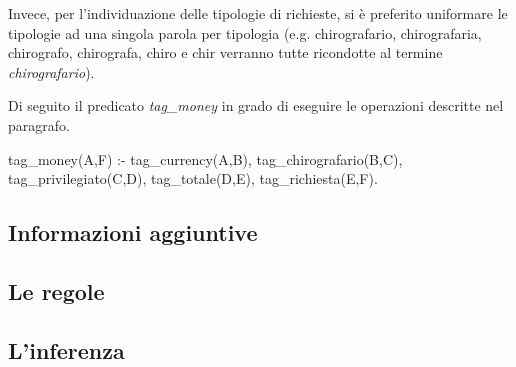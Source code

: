 Invece, per l'individuazione delle tipologie di richieste, si è preferito uniformare le tipologie ad una singola parola per tipologia (e.g. chirografario, chirografaria, chirografo, chirografa, chiro e chir verranno tutte ricondotte al termine \emph{chirografario}).

Di seguito il predicato \emph{tag\_money} in grado di eseguire le operazioni descritte nel paragrafo.

\begin{prologcode}
tag_money(A,F) :- 
    tag_currency(A,B),
    tag_chirografario(B,C),
    tag_privilegiato(C,D),
    tag_totale(D,E),
    tag_richiesta(E,F).
\end{prologcode}

\subsection{Informazioni aggiuntive}



\subsection{Le regole}
\subsection{L'inferenza}